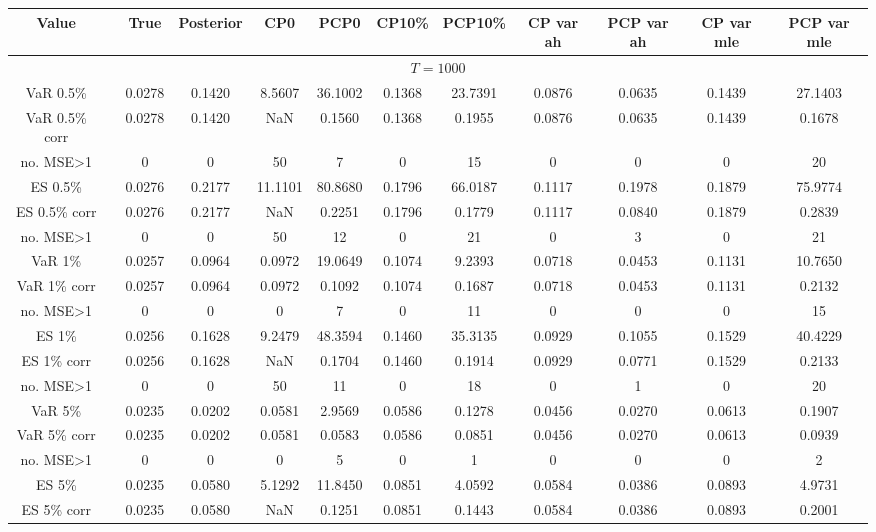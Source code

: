 { \renewcommand{\arraystretch}{1.2} 
\begin{sidewaystable} 
\center 
\begin{tabular}{cc cc cccc cccc} 
Value && True & Posterior & CP0  & PCP0 & CP10\%  & PCP10\% &CP var ah & PCP var ah & CP var mle & PCP var mle \\ \hline 
\hline 
\multicolumn{12}{c}{$T =1000$}  \\ 
\hline 
VaR 0.5\% && 0.0278 & 0.1420 & 8.5607 & 36.1002 & 0.1368 & 23.7391 &0.0876 & 0.0635 & 0.1439 & 27.1403 \\ 
VaR 0.5\% corr && 0.0278 & 0.1420 &    NaN & 0.1560 & 0.1368 & 0.1955 &0.0876 & 0.0635 & 0.1439 & 0.1678 \\ 
no. MSE>1 && 0 & 0 & 50 & 7 & 0 & 15 &0 & 0 & 0 & 20 \\[1ex] 
ES 0.5\% && 0.0276 & 0.2177 & 11.1101 & 80.8680 & 0.1796 & 66.0187 &0.1117 & 0.1978 & 0.1879 & 75.9774 \\ 
ES 0.5\% corr && 0.0276 & 0.2177 &    NaN & 0.2251 & 0.1796 & 0.1779 &0.1117 & 0.0840 & 0.1879 & 0.2839 \\ 
no. MSE>1 && 0 & 0 & 50 & 12 & 0 & 21 &0 & 3 & 0 & 21 \\[1.5ex] 
VaR 1\% && 0.0257 & 0.0964 & 0.0972 & 19.0649 & 0.1074 & 9.2393 &0.0718 & 0.0453 & 0.1131 & 10.7650 \\ 
VaR 1\% corr && 0.0257 & 0.0964 & 0.0972 & 0.1092 & 0.1074 & 0.1687 &0.0718 & 0.0453 & 0.1131 & 0.2132 \\ 
no. MSE>1 && 0 & 0 & 0 & 7 & 0 & 11 &0 & 0 & 0 & 15 \\[1ex] 
ES 1\% && 0.0256 & 0.1628 & 9.2479 & 48.3594 & 0.1460 & 35.3135 &0.0929 & 0.1055 & 0.1529 & 40.4229 \\ 
ES 1\% corr && 0.0256 & 0.1628 &    NaN & 0.1704 & 0.1460 & 0.1914 &0.0929 & 0.0771 & 0.1529 & 0.2133 \\ 
no. MSE>1 && 0 & 0 & 50 & 11 & 0 & 18 &0 & 1 & 0 & 20 \\[1.5ex] 
VaR 5\% && 0.0235 & 0.0202 & 0.0581 & 2.9569 & 0.0586 & 0.1278 &0.0456 & 0.0270 & 0.0613 & 0.1907 \\ 
VaR 5\% corr && 0.0235 & 0.0202 & 0.0581 & 0.0583 & 0.0586 & 0.0851 &0.0456 & 0.0270 & 0.0613 & 0.0939 \\ 
no. MSE>1 && 0 & 0 & 0 & 5 & 0 & 1 &0 & 0 & 0 & 2 \\[1ex] 
ES 5\% && 0.0235 & 0.0580 & 5.1292 & 11.8450 & 0.0851 & 4.0592 &0.0584 & 0.0386 & 0.0893 & 4.9731 \\ 
ES 5\% corr && 0.0235 & 0.0580 &    NaN & 0.1251 & 0.0851 & 0.1443 &0.0584 & 0.0386 & 0.0893 & 0.2001 \\ 

\end{tabular}
\end{sidewaystable}}
